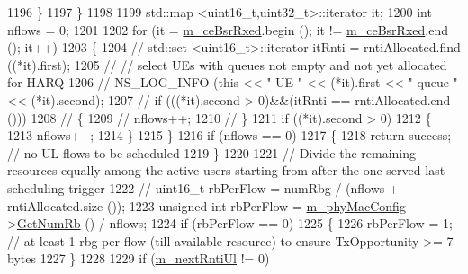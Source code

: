 \begin{DoxyCode}
1196                 \}
1197         \}
1198 
1199         std::map <uint16\_t,uint32\_t>::iterator it;
1200         \textcolor{keywordtype}{int} nflows = 0;
1201 
1202         \textcolor{keywordflow}{for} (it = \hyperlink{classns3_1_1MmWaveRrMacScheduler_a2ebec374f1ff5014f115ff8b68ff5ebb}{m\_ceBsrRxed}.begin (); it != \hyperlink{classns3_1_1MmWaveRrMacScheduler_a2ebec374f1ff5014f115ff8b68ff5ebb}{m\_ceBsrRxed}.end (); it++)
1203         \{
1204                 \textcolor{comment}{//                            std::set <uint16\_t>::iterator itRnti = rntiAllocated.find
       ((*it).first);}
1205                 \textcolor{comment}{//                            // select UEs with queues not empty and not yet allocated for
       HARQ}
1206                 \textcolor{comment}{//                            NS\_LOG\_INFO (this << " UE " << (*it).first << " queue " <<
       (*it).second);}
1207                 \textcolor{comment}{//                            if (((*it).second > 0)&&(itRnti == rntiAllocated.end ()))}
1208                 \textcolor{comment}{//                              \{}
1209                 \textcolor{comment}{//                                nflows++;}
1210                 \textcolor{comment}{//                              \}}
1211                 \textcolor{keywordflow}{if} ((*it).second > 0)
1212                 \{
1213                         nflows++;
1214                 \}
1215         \}
1216         \textcolor{keywordflow}{if} (nflows == 0)
1217         \{
1218                 \textcolor{keywordflow}{return} success;  \textcolor{comment}{// no UL flows to be scheduled}
1219         \}
1220 
1221         \textcolor{comment}{// Divide the remaining resources equally among the active users starting from after the one served
       last scheduling trigger}
1222         \textcolor{comment}{//                        uint16\_t rbPerFlow = numRbg / (nflows + rntiAllocated.size ());}
1223         \textcolor{keywordtype}{unsigned} \textcolor{keywordtype}{int} rbPerFlow = \hyperlink{classns3_1_1MmWaveMacScheduler_a24d7af4971d2e500fe543cefbafa2fd9}{m\_phyMacConfig}->\hyperlink{classns3_1_1MmWavePhyMacCommon_a4c5f323fd722d6eec52efda5d76f97ad}{GetNumRb} () / nflows;
1224         \textcolor{keywordflow}{if} (rbPerFlow == 0)
1225         \{
1226                 rbPerFlow = 1;  \textcolor{comment}{// at least 1 rbg per flow (till available resource) to ensure
       TxOpportunity >= 7 bytes}
1227         \}
1228 
1229         \textcolor{keywordflow}{if} (\hyperlink{classns3_1_1MmWaveRrMacScheduler_ac9c27bbc2f828923b14cbc3b6ed5be57}{m\_nextRntiUl} != 0)

\end{DoxyCode}
